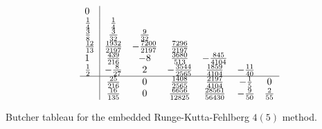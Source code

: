\begin{table}
  \begin{equation*}
    \begin{array}{l | c c c c c c}
      0      &           &            &             &             &        &\\
      \frac{1}{4}    & \frac{1}{4}       &            &             &             &        &\\
      \frac{3}{8}    & \frac{3}{32}      & \frac{9}{32}       &             &             &        &\\
      \frac{12}{13}  & \frac{1932}{2197} & -\frac{7200}{2197} & \frac{7296}{2197}   &             &        &\\
      1      & \frac{439}{216}   & -8         & \frac{3680}{513}    & -\frac{845}{4104}   &        &\\
      \frac{1}{2}    & -\frac{8}{27}     & 2          & -\frac{3544}{2565}  & \frac{1859}{4104}   & -\frac{11}{40} &\\\hline
      & \frac{25}{216}    & 0          & \frac{1408}{2565}   & \frac{2197}{4104}   & -\frac{1}{5}   & 0      \\
      & \frac{16}{135}    & 0          & \frac{6656}{12825}  & \frac{28561}{56430} & -\frac{9}{50}  & \frac{2}{55}
    \end{array}
  \end{equation*}
  \caption{Butcher tableau for the embedded Runge-Kutta-Fehlberg $4(5)$ method.}
  \label{tab:rkf45}
\end{table}



